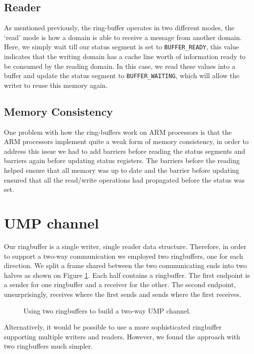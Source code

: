 \subsection{Reader}
As mentioned previously, the ring-buffer operates in two different modes, the `read' mode is how a domain is able to receive a message from another domain. Here, we simply wait till our status segment is set to \texttt{BUFFER_READY}, this value indicates that the writing domain has a cache line worth of information ready to be consumed by the reading domain. In this case, we read these values into a buffer and update the status segment to \texttt{BUFFER_WAITING}, which will allow the writer to reuse this memory again. 

\subsection{Memory Consistency}
One problem with how the ring-buffers work on ARM processors is that the ARM processors implement quite a weak form of memory consistency, in order to address this issue we had to add barriers before reading the status segments and barriers again before updating status registers. The barriers before the reading helped ensure that all memory was up to date and the barrier before updating ensured that all the read/write operations had propagated before the status was set.  

\section{UMP channel}
Our ringbuffer is a single writer, single reader data structure. Therefore, in order to support a two-way communication we employed two ringbuffers, one for each direction. We split a frame shared between the two communicating ends into two halves as shown on Figure \ref{fig:ump_panes}. Each half contains a ringbuffer. The first endpoint is a sender for one ringbuffer and a receiver for the other. The second endpoint, unsurprisingly, receives where the first sends and sends where the first receives.

\begin{figure}[ht]
    \centering
        \scalebox{0.8}{
            
        }
    \caption{Using two ringbuffers to build a two-way UMP channel.}
    \label{fig:ump_panes}
\end{figure}

Alternatively, it would be possible to use a more sophisticated ringbuffer supporting multiple writers and readers. However, we found the approach with two ringbuffers much simpler.

